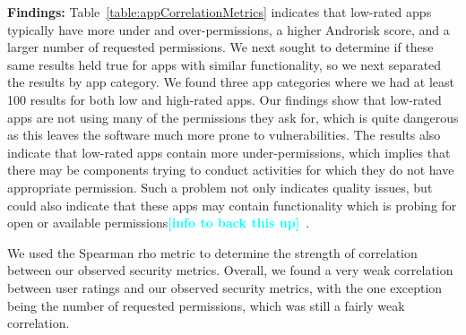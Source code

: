 \documentclass{sig-alternate-05-2015}
\newcommand{\todo}[1]{\textcolor{cyan}{\textbf{[#1]}}}
\begin{document}







\textbf{Findings:} Table~\ref{table:appCorrelationMetrics} indicates that low-rated apps typically have more under and over-permissions, a higher Androrisk score, and a larger number of requested permissions. We next sought to determine if these same results held true for apps with similar functionality, so we next separated the results by app category. We found three app categories where we had at least 100 results for both low and high-rated apps. Our findings show that low-rated apps are not using many of the permissions they ask for, which is quite dangerous as this leaves the software much more prone to vulnerabilities. The results also indicate that low-rated apps contain more under-permissions, which implies that there may be components trying to conduct activities for which they do not have appropriate permission. Such a problem not only indicates quality issues, but could also indicate that these apps may contain functionality which is probing for open or available permissions\todo{info to back this up}~\cite{7371575, Grace:2012:UEA:2185448.2185464}.

We used the Spearman rho metric to determine the strength of correlation between our observed security metrics. Overall, we found a very weak correlation between user ratings and our observed security metrics, with the one exception being the number of requested permissions, which was still a fairly weak correlation.


%

\end{document}

